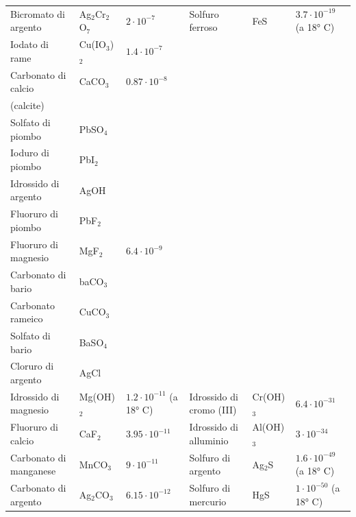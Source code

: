 \begin{tabular}{p{4cm}p{1.6cm}p{2cm}p{4cm}p{1.6cm}p{2cm}}
    Bicromato di argento & Ag$_2$Cr$_2$O$_7$ & $2 \cdot 10^{-7}$ & Solfuro ferroso & FeS & $3.7 \cdot 10^{-19}$ (a 18° C)\\[0.7ex]
    Iodato di rame & Cu(IO$_3$)$_2$ & $1.4 \cdot 10^{-7}$ & & & \\[0.7ex]
    Carbonato di calcio & CaCO$_3$ & $0.87 \cdot 10^{-8}$ & & & \\[0.7ex]
    (calcite)&&&&&\\[0.7ex]
    Solfato di piombo & PbSO$_4$ & & & &\\[0.7ex]
    Ioduro di piombo & PbI$_2$ &  &  &  & \\[0.7ex]
    Idrossido di argento & AgOH &  &  &  & \\[0.7ex]
    Fluoruro di piombo & PbF$_2$ &  &  &  & \\[0.7ex]
    Fluoruro di magnesio & MgF$_2$ & $6.4 \cdot 10^{-9}$&&&\\[0.7ex]
    Carbonato di bario & baCO$_3$ &  &  &  & \\[0.7ex]
    Carbonato rameico & CuCO$_3$ &  &  &  &\\[0.7ex]
    Solfato di bario & BaSO$_4$&  &  &  & \\[0.7ex]
    Cloruro di argento & AgCl &  &  &  & \\[0.7ex]
    Idrossido di magnesio & Mg(OH)$_2$ & $1.2 \cdot 10^{-11}$ (a 18° C) & Idrossido di cromo (III) & Cr(OH)$_3$ & $6.4 \cdot 10^{-31}$\\[0.7ex]
    Fluoruro di calcio & CaF$_2$ & $3.95 \cdot 10^{-11}$ & Idrossido di alluminio & Al(OH)$_3$ & $3 \cdot 10^{-34}$\\[0.7ex]
    Carbonato di manganese & MnCO$_3$ & $9 \cdot 10^{-11}$ & Solfuro di argento & Ag$_2$S & $1.6 \cdot 10^{-49}$ (a 18° C)\\[0.7ex]
    Carbonato di argento & Ag$_2$CO$_3$ & $6.15 \cdot 10^{-12}$ & Solfuro di mercurio & HgS & $1 \cdot 10^{-50}$ (a 18° C)\\[0.7ex]

\end{tabular}


